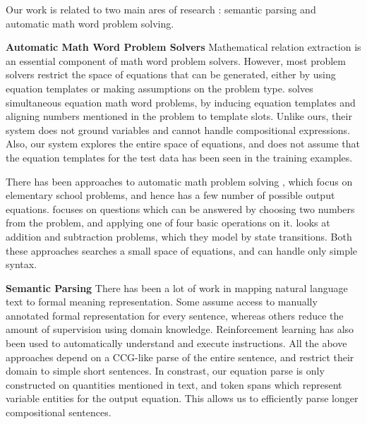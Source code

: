   Our work is related to two main ares of research : semantic parsing and
  automatic math word problem solving.

  \noindent
  \textbf{Automatic Math Word Problem Solvers} Mathematical relation
  extraction is an essential component of math word problem
  solvers. However, most problem solvers restrict the space of
  equations that can be generated, either by using equation templates
  or making assumptions on the problem type. \cite{KushmanZeBa14} solves
  simultaneous equation math word problems, by inducing equation
  templates and aligning numbers mentioned in the problem to template
  slots. Unlike ours, their system does not ground variables and
  cannot handle compositional expressions. Also, our system explores
  the entire space of equations, and does not assume that the equation
  templates for the test data has been seen in the training examples.

  There has been approaches to automatic math problem
  solving \cite{RoyViRo15,HosseiniHaEt14}, which focus on elementary
  school problems, and hence has a few number of possible output
  equations. \cite{RoyViRo15} focuses on questions which can be
  answered by choosing two numbers from the problem, and applying one
  of four basic operations on it. \cite{HosseiniHaEt14} looks at
  addition and subtraction problems, which they model by state
  transitions. Both these approaches searches a small space of
  equations, and can handle only simple syntax.

  \noindent \textbf{Semantic Parsing} There has been a lot of work in
  mapping natural language text to formal meaning
  representation. Some \cite{ZettlemoyerCo05,GeMo06} assume access to
  manually annotated formal representation for every sentence, whereas
  others \cite{ECGR09,KateMo07,GoldwasserRo11,GRCR11} reduce the
  amount of supervision using domain knowledge. Reinforcement learning
  has also been used \cite{BCZB09,BranavanZeBa10,VogelJu10} to
  automatically understand and execute instructions. All the above
  approaches depend on a CCG-like parse of the entire sentence, and
  restrict their domain to simple short sentences. In constrast, our
  equation parse is only constructed on quantities mentioned in text,
  and token spans which represent variable entities for the output
  equation. This allows us to efficiently parse longer compositional
  sentences.
